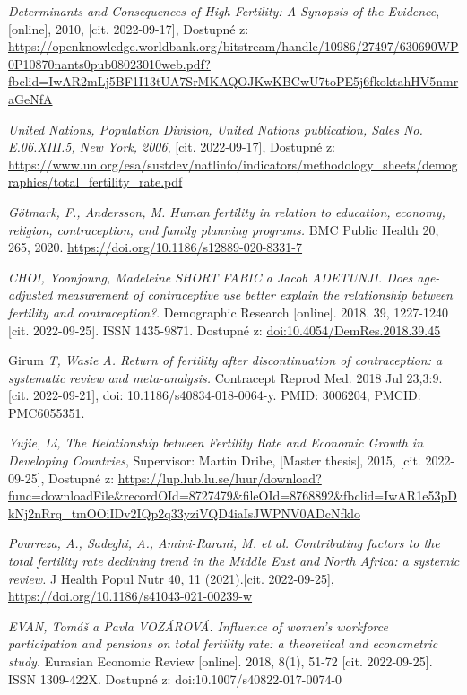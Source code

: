 \documentclass[thesis=M,czech]{FITthesis}[2022/10/08]
\begin{document}
%
%
\begin{thebibliography}{99}
\textit{Determinants and Consequences of High Fertility: A Synopsis of the Evidence}, [online], 2010, [cit. 2022-09-17], Dostupné z: \url{https://openknowledge.worldbank.org/bitstream/handle/10986/27497/630690WP0P10870nants0pub08023010web.pdf?fbclid=IwAR2mLj5BF1I13tUA7SrMKAQOJKwKBCwU7toPE5j6fkoktahHV5nmraGeNfA}

\textit{United Nations, Population Division, United Nations publication, Sales No. E.06.XIII.5, New York, 2006}, [cit. 2022-09-17], Dostupné z: \url{https://www.un.org/esa/sustdev/natlinfo/indicators/methodology_sheets/demographics/total_fertility_rate.pdf}

\textit{Götmark, F., Andersson, M. Human fertility in relation to education, economy, religion, contraception, and family planning programs.} BMC Public Health 20, 265, 2020. \url{https://doi.org/10.1186/s12889-020-8331-7}

\textit{CHOI, Yoonjoung, Madeleine SHORT FABIC a Jacob ADETUNJI. Does age-adjusted measurement of contraceptive use better explain the relationship between fertility and contraception?}. Demographic Research [online]. 2018, 39, 1227-1240 [cit. 2022-09-25]. ISSN 1435-9871. Dostupné z: \url{doi:10.4054/DemRes.2018.39.45}

Girum \textit{T, Wasie A. Return of fertility after discontinuation of contraception: a systematic review and meta-analysis.} Contracept Reprod Med. 2018 Jul 23,3:9. [cit. 2022-09-21], doi: 10.1186/s40834-018-0064-y. PMID: 3006204, PMCID: PMC6055351.

 \textit{Yujie, Li, The Relationship between Fertility Rate and
Economic Growth in Developing Countries}, Supervisor: Martin Dribe, [Master thesis], 2015, [cit. 2022-09-25], Dostupné z: \url{https://lup.lub.lu.se/luur/download?func=downloadFile&recordOId=8727479&fileOId=8768892&fbclid=IwAR1e53pDkNj2nRrq_tmOOiIDv2IQp2q33yziVQD4iaIsJWPNV0ADcNfklo}

 \textit{Pourreza, A., Sadeghi, A., Amini-Rarani, M. et al. Contributing factors to the total fertility rate declining trend in the Middle East and North Africa: a systemic review.} J Health Popul Nutr 40, 11 (2021).[cit. 2022-09-25], \url{https://doi.org/10.1186/s41043-021-00239-w}

 \textit{EVAN, Tomáš a Pavla VOZÁROVÁ. Influence of women’s workforce participation and pensions on total fertility rate: a theoretical and econometric study.} Eurasian Economic Review [online]. 2018, 8(1), 51-72 [cit. 2022-09-25]. ISSN 1309-422X. Dostupné z: doi:10.1007/s40822-017-0074-0


\end{thebibliography}
\end{document}
